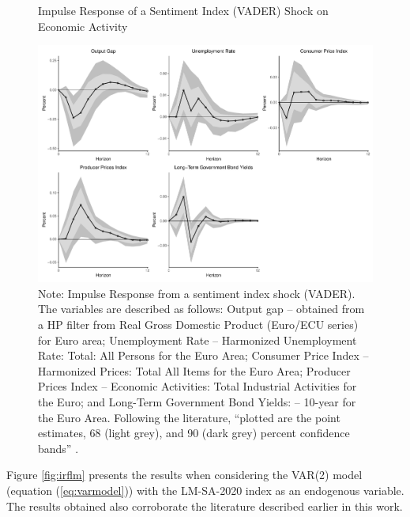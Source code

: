 \begin{figure}[!h]
    \centering
    \caption{Impulse Response of a Sentiment Index (VADER) Shock on Economic Activity}
    \includegraphics[width=\textwidth]{images/irf_vader.pdf}
    \caption*{Note: Impulse Response from a sentiment index shock (VADER). The variables are described as follows: Output gap -- obtained from a HP filter from Real Gross Domestic Product (Euro/ECU series) for Euro area; Unemployment Rate -- Harmonized Unemployment Rate: Total: All Persons for the Euro Area; Consumer Price Index -- Harmonized Prices: Total All Items for the Euro Area; Producer Prices Index -- Economic Activities: Total Industrial Activities for the Euro; and Long-Term Government Bond Yields: -- 10-year for the Euro Area. Following the literature, ``plotted are the point estimates, 68 (light grey), and 90 (dark grey) percent confidence bands'' \cite[p. 40]{shapiro2020measuring}.}
    \label{fig:irfvader}
\end{figure}

Figure \ref{fig:irflm} presents the results when considering the VAR(2) model (equation (\ref{eq:varmodel})) with the LM-SA-2020 index as an endogenous variable. The results obtained also corroborate the literature described earlier in this work. \\


